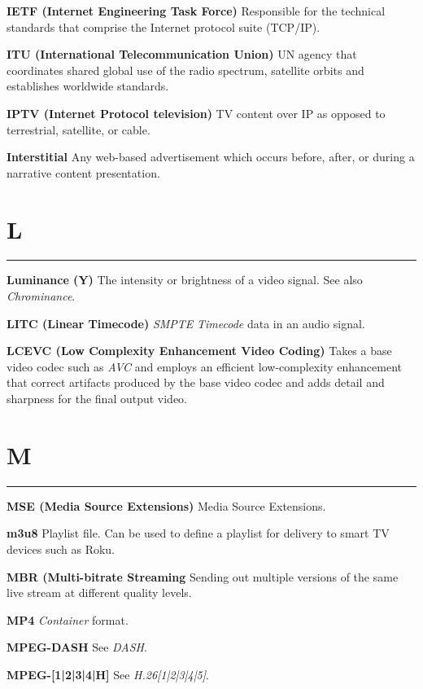 \smallskip
\textbf{IETF (Internet Engineering Task Force)}
Responsible for the technical standards that comprise the Internet protocol suite (TCP/IP).

\smallskip
\textbf{ITU (International Telecommunication Union)}
UN agency that coordinates shared global use of the radio spectrum, satellite orbits and establishes worldwide standards.

\smallskip
\textbf{IPTV (Internet Protocol television)}
TV content over IP as opposed to terrestrial, satellite, or cable.

\smallskip
\textbf{Interstitial}
Any web-based advertisement which occurs before, after, or during a narrative content presentation.

\section{L}
\hrule

\smallskip
\textbf{Luminance (Y)}
The intensity or brightness of a video signal. See also \textit{Chrominance}.

\smallskip
\textbf{LITC (Linear Timecode)}
\textit{SMPTE} \textit{Timecode} data in an audio signal.

\smallskip
\textbf{LCEVC (Low Complexity Enhancement Video Coding)}
Takes a base video codec such as \textit{AVC} and employs an efficient low-complexity enhancement that correct artifacts produced by the base video codec and adds detail and sharpness for the final output video.


\section{M}
\hrule

\medskip
\textbf{MSE (Media Source Extensions)}
Media Source Extensions.

\smallskip
\textbf{m3u8}
Playlist file.  Can be used to define a playlist for delivery to smart TV devices such as Roku.

\smallskip
\textbf{MBR (Multi-bitrate Streaming}
Sending out multiple versions of the same live stream at different quality levels.

\smallskip
\textbf{MP4}
\textit{Container} format.

\smallskip
\textbf{MPEG-DASH}
See \textit{DASH}.

\smallskip
\textbf{MPEG-[1|2|3|4|H]}
See \textit{H.26[1|2|3|4|5]}.

